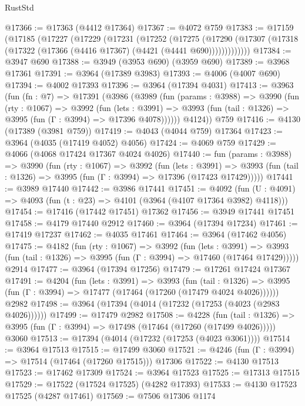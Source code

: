 \begin{lexlean}{RustStd}
\begin{coremodule}
{\begin{coremodule}
{{{{{{{{{{{{{{{{{{{{{{{{{{{{{{{{{{{{{{@17366 := @17363 (@4412 @17364)
@17367 := @4072 @759
@17383 := @17159
    (@17185
      (@17227
        (@17229
          (@17231
            (@17252
              (@17275
                (@17290
                  (@17307 (@17318 (@17322 (@17366 (@4416 @17367) (@4421 (@4441 @690)))))))))))))
@17384 := @3947 @690
@17388 := @3949 (@3953 @690) (@3959 @690)
@17389 := @3968 @17361
@17391 := @3964 (@17389 @3983)
@17393 := @4006 (@4007 @690)
@17394 := @4002 @17393
@17396 := @3964 (@17394 @4031)
@17413 := @3963
    (fun (fn : @7) =>
    @17391
      (@3986
        (@3989
          (fun (params : @3988) =>
          @3990
            (fun (rty : @1067) =>
            @3992
              (fun (lets : @3991) =>
              @3993 (fun (tail : @1326) => @3995 (fun (Γ : @3994) => @17396 @4078))))))
        @4124))
    @759
@17416 := @4130 (@17389 (@3981 @759))
@17419 := @4043 (@4044 @759) @17364
@17423 := @3964 (@4035 (@17419 @4052) @4056)
@17424 := @4069 @759
@17429 := @4066 (@4068 @17424 @17367 @4024 @4026)
@17440 := fun (params : @3988) =>
  @3990
    (fun (rty : @1067) =>
    @3992
      (fun (lets : @3991) =>
      @3993 (fun (tail : @1326) => @3995 (fun (Γ : @3994) => @17396 (@17423 @17429)))))
@17441 := @3989 @17440
@17442 := @3986 @17441
@17451 := @4092
    (fun (U : @4091) => @4093 (fun (t : @23) => @4101 (@3964 (@4107 @17364 @3982) @4118)))
@17454 := @17416 (@17442 @17451) @17362
@17456 := @3949 @17441 @17451
@17458 := @4179 @17440 @2912
@17460 := @3964 (@17394 @17234)
@17461 := @17419 @17237
@17462 := @4035 @17461
@17464 := @3964 (@17462 @4056)
@17475 := @4182
    (fun (rty : @1067) =>
    @3992
      (fun (lets : @3991) =>
      @3993 (fun (tail : @1326) => @3995 (fun (Γ : @3994) => @17460 (@17464 @17429)))))
    @2914
@17477 := @3964 (@17394 @17256)
@17479 := @17261 @17424 @17367
@17491 := @4204
    (fun (lets : @3991) =>
    @3993
      (fun (tail : @1326) =>
      @3995 (fun (Γ : @3994) => @17477 (@17464 (@17260 (@17479 @4024 @4026))))))
    @2982
@17498 := @3964 (@17394 (@4014 (@17232 (@17253 (@4023 (@2983 @4026))))))
@17499 := @17479 @2982
@17508 := @4228
    (fun (tail : @1326) => @3995 (fun (Γ : @3994) => @17498 (@17464 (@17260 (@17499 @4026)))))
    @3060
@17513 := @17394 (@4014 (@17232 (@17253 (@4023 @3061))))
@17514 := @3964 @17513
@17515 := @17499 @3060
@17521 := @4246 (fun (Γ : @3994) => @17514 (@17464 (@17260 @17515))) @17306
@17522 := @4130 @17513
@17523 := @17462 @17309
@17524 := @3964 @17523
@17525 := @17313 @17515
@17529 := @17522 (@17524 @17525) (@4282 @17393)
@17533 := @4130 @17523 @17525 (@4287 @17461)
@17569 := @7506
    @17306
    @1174
}}}}}}}}}}}}}}}}}}}}}}}}}}}}}}}}}}}}}}
\end{coremodule}}
\end{coremodule}
\end{lexlean}

